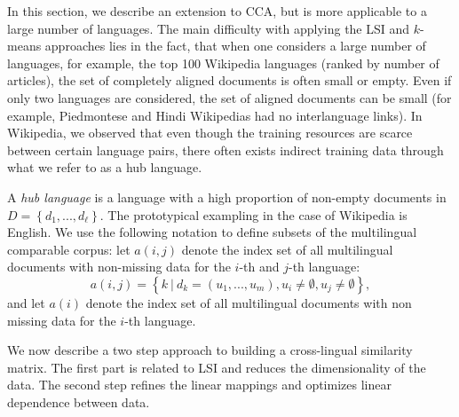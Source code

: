 \documentclass[twoside,11pt]{article}
\begin{document}
In this section, we describe an extension to CCA, but is more applicable to a large number of languages. The main difficulty with applying the
LSI and $k$-means approaches lies in the fact, that when one considers a large number of languages, for example, the top 100 Wikipedia languages (ranked by number of articles), the set of completely
aligned documents is often small or empty. Even if only two languages are considered, the set of aligned documents can be small (for example, Piedmontese and Hindi
Wikipedias had no interlanguage links). In Wikipedia, we observed that even though the training resources are scarce between certain language pairs, there often exists indirect training data
through what we refer to as a hub language.

A \emph{hub language} is a language with a high proportion of non-empty documents in $D = \left\{d_1,..., d_{\ell}\right\}$. The prototypical  exampling  in the case of Wikipedia is English. We use the following notation to define subsets of the multilingual comparable corpus: let $a(i,j)$ denote the index set of all multilingual documents with non-missing data for the $i$-th and $j$-th language:  $$a(i,j) = \left\{k~ |~ d_k = (u_1,...,u_m), u_i \neq \emptyset, u_j \neq \emptyset \right\},$$ and let $a(i)$ denote the index set of all multilingual documents with non missing data for the $i$-th language.

We now describe a two step approach to building a cross-lingual similarity matrix. The first part is related to LSI and reduces the dimensionality of the data. The second step refines the linear mappings and optimizes linear dependence between data.
\end{document}
